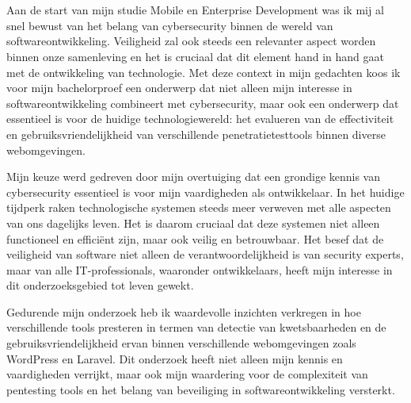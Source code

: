 
\chapter*{}%
\label{ch:voorwoord}


Aan de start van mijn studie Mobile en Enterprise Development was ik mij al snel bewust van het belang van cybersecurity binnen de wereld van softwareontwikkeling. 
Veiligheid zal ook steeds een relevanter aspect worden binnen onze samenleving en het is cruciaal dat dit element hand in hand gaat met de ontwikkeling van technologie. 
Met deze context in mijn gedachten koos ik voor mijn bachelorproef een onderwerp dat niet alleen mijn interesse in softwareontwikkeling combineert met cybersecurity, 
maar ook een onderwerp dat essentieel is voor de huidige technologiewereld: het evalueren van de effectiviteit en gebruiksvriendelijkheid van verschillende 
penetratietesttools binnen diverse webomgevingen.

Mijn keuze werd gedreven door mijn overtuiging dat een grondige kennis van cybersecurity essentieel is voor mijn vaardigheden als ontwikkelaar. In het huidige 
tijdperk raken technologische systemen steeds meer verweven met alle aspecten van ons dagelijks leven. Het is daarom cruciaal dat deze systemen niet alleen 
functioneel en efficiënt zijn, maar ook veilig en betrouwbaar. Het besef dat de veiligheid van software niet alleen de verantwoordelijkheid 
is van security experts, maar van alle IT-professionals, waaronder ontwikkelaars, heeft mijn interesse in dit onderzoeksgebied tot leven gewekt.

Gedurende mijn onderzoek heb ik waardevolle inzichten verkregen in hoe verschillende tools presteren in termen van detectie van kwetsbaarheden en de 
gebruiksvriendelijkheid ervan binnen verschillende webomgevingen zoals WordPress en Laravel. Dit onderzoek heeft niet alleen mijn kennis en vaardigheden 
verrijkt, maar ook mijn waardering voor de complexiteit van pentesting tools en het belang van beveiliging in softwareontwikkeling versterkt.


